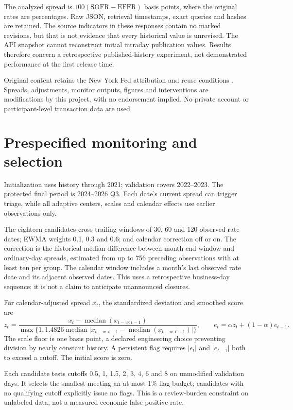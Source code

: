 \documentclass[11pt]{article}
\begin{document}
The analyzed spread is $100(\mathrm{SOFR}-\mathrm{EFFR})$ basis points, where the original rates are percentages. Raw JSON, retrieval timestamps, exact queries and hashes are retained. The source indicators in these responses contain no marked revisions, but that is not evidence that every historical value is unrevised. The API snapshot cannot reconstruct initial intraday publication values. Results therefore concern a retrospective published-history experiment, not demonstrated performance at the first release time.

Original content retains the New York Fed attribution and reuse conditions \cite{terms}. Spreads, adjustments, monitor outputs, figures and interventions are modifications by this project, with no endorsement implied. No private account or participant-level transaction data are used.

\section{Prespecified monitoring and selection}
Initialization uses history through 2021; validation covers 2022--2023. The protected final period is 2024--2026 Q3. Each date's current spread can trigger triage, while all adaptive centers, scales and calendar effects use earlier observations only.

The eighteen candidates cross trailing windows of 30, 60 and 120 observed-rate dates; EWMA weights 0.1, 0.3 and 0.6; and calendar correction off or on. The correction is the historical median difference between month-end-window and ordinary-day spreads, estimated from up to 756 preceding observations with at least ten per group. The calendar window includes a month's last observed rate date and its adjacent observed dates. This uses a retrospective business-day sequence; it is not a claim to anticipate unannounced closures.

For calendar-adjusted spread $x_t$, the standardized deviation and smoothed score are
\[
 z_t=\frac{x_t-\operatorname{median}(x_{t-w:t-1})}
 {\max\{1,1.4826\operatorname{median}|x_{t-w:t-1}-\operatorname{median}(x_{t-w:t-1})|\}},
 \qquad e_t=\alpha z_t+(1-\alpha)e_{t-1}.
\]
The scale floor is one basis point, a declared engineering choice preventing division by nearly constant history. A persistent flag requires $|e_t|$ and $|e_{t-1}|$ both to exceed a cutoff. The initial score is zero.

Each candidate tests cutoffs 0.5, 1, 1.5, 2, 3, 4, 6 and 8 on unmodified validation days. It selects the smallest meeting an at-most-1\% flag budget; candidates with no qualifying cutoff explicitly issue no flags. This is a review-burden constraint on unlabeled data, not a measured economic false-positive rate.
\end{document}
